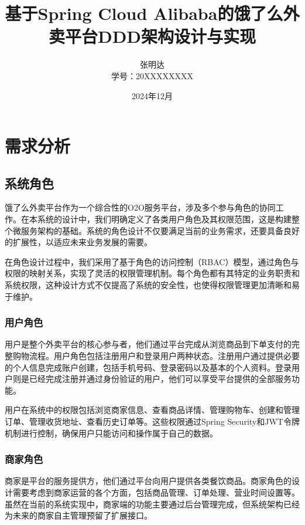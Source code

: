 \documentclass[a4paper,12pt]{article}
\title{\huge 基于Spring Cloud Alibaba的饿了么外卖平台DDD架构设计与实现}
\author{张明达 \\ 学号：20XXXXXXXX}
\date{2024年12月}
\begin{document}
\maketitle
\newpage

\tableofcontents
\newpage

\section{需求分析}

\subsection{系统角色}

饿了么外卖平台作为一个综合性的O2O服务平台，涉及多个参与角色的协同工作。在本系统的设计中，我们明确定义了各类用户角色及其权限范围，这是构建整个微服务架构的基础。系统的角色设计不仅要满足当前的业务需求，还要具备良好的扩展性，以适应未来业务发展的需要。

在角色设计过程中，我们采用了基于角色的访问控制（RBAC）模型，通过角色与权限的映射关系，实现了灵活的权限管理机制。每个角色都有其特定的业务职责和系统权限，这种设计方式不仅提高了系统的安全性，也使得权限管理更加清晰和易于维护。

\subsubsection{用户角色}

用户是整个外卖平台的核心参与者，他们通过平台完成从浏览商品到下单支付的完整购物流程。用户角色包括注册用户和登录用户两种状态。注册用户通过提供必要的个人信息完成账户创建，包括手机号码、登录密码以及基本的个人资料。登录用户则是已经完成注册并通过身份验证的用户，他们可以享受平台提供的全部服务功能。

用户在系统中的权限包括浏览商家信息、查看商品详情、管理购物车、创建和管理订单、管理收货地址、查看历史订单等。这些权限通过Spring Security和JWT令牌机制进行控制，确保用户只能访问和操作属于自己的数据。

\subsubsection{商家角色}

商家是平台的服务提供方，他们通过平台向用户提供各类餐饮商品。商家角色的设计需要考虑到商家运营的各个方面，包括商品管理、订单处理、营业时间设置等。虽然在当前的系统实现中，商家端的功能主要通过后台管理完成，但系统架构已经为未来的商家自主管理预留了扩展接口。
\end{document}
